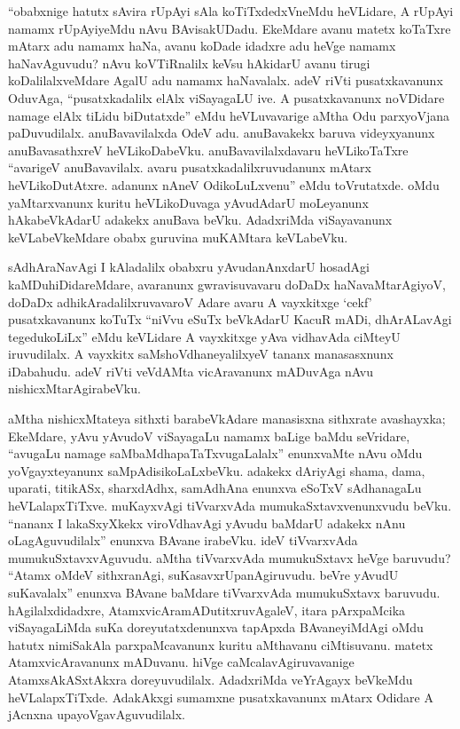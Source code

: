 ``obabxnige hatutx sAvira rUpAyi sAla koTiTxdedxVneMdu heVLidare, A rUpAyi namamx rUpAyiyeMdu nAvu BAvisakUDadu. EkeMdare avanu matetx koTaTxre mAtarx adu namamx haNa, avanu koDade idadxre adu heVge namamx haNavAguvudu? nAvu koVTiRnalilx keVsu hAkidarU avanu tirugi koDalilalxveMdare AgalU adu namamx haNavalalx. adeV riVti pusatxkavanunx OduvAga, ``pusatxkadalilx elAlx viSayagaLU ive. A pusatxkavanunx noVDidare namage elAlx tiLidu biDutatxde'' eMdu heVLuvavarige aMtha Odu parxyoVjana paDuvudilalx. anuBavavilalxda OdeV adu. anuBavakekx baruva videyxyanunx anuBavasathxreV heVLikoDabeVku. anuBavavilalxdavaru heVLikoTaTxre ``avarigeV anuBavavilalx. avaru pusatxkadalilxruvudanunx mAtarx heVLikoDutAtxre. adanunx nAneV OdikoLuLxvenu'' eMdu toVrutatxde. oMdu yaMtarxvanunx kuritu heVLikoDuvaga yAvudAdarU moLeyanunx hAkabeVkAdarU adakekx anuBava beVku. AdadxriMda viSayavanunx keVLabeVkeMdare obabx guruvina muKAMtara keVLabeVku.

sAdhAraNavAgi I kAladalilx obabxru yAvudanAnxdarU hosadAgi kaMDuhiDidareMdare, avaranunx gwravisuvavaru doDaDx haNavaMtarAgiyoV, doDaDx adhikAradalilxruvavaroV Adare avaru A vayxkitxge `cekf' pusatxkavanunx koTuTx ``niVvu eSuTx beVkAdarU KacuR mADi, dhArALavAgi tegedukoLiLx'' eMdu keVLidare A vayxkitxge yAva vidhavAda ciMteyU iruvudilalx. A vayxkitx saMshoVdhaneyalilxyeV tananx manasasxnunx iDabahudu. adeV riVti veVdAMta vicAravanunx mADuvAga nAvu nishicxMtarAgirabeVku.

aMtha nishicxMtateya sithxti barabeVkAdare manasisxna sithxrate avashayxka; EkeMdare, yAvu yAvudoV viSayagaLu namamx baLige baMdu seVridare, ``avugaLu namage saMbaMdhapaTaTxvugaLalalx'' enunxvaMte nAvu oMdu yoVgayxteyanunx saMpAdisikoLaLxbeVku. adakekx dAriyAgi shama, dama, uparati, titikASx, sharxdAdhx, samAdhAna enunxva eSoTxV sAdhanagaLu heVLalapxTiTxve. muKayxvAgi tiVvarxvAda mumukaSxtavxvenunxvudu beVku. ``nananx I lakaSxyXkekx viroVdhavAgi yAvudu baMdarU adakekx nAnu oLagAguvudilalx'' enunxva BAvane irabeVku. ideV tiVvarxvAda mumukuSxtavxvAguvudu. aMtha tiVvarxvAda mumukuSxtavx heVge baruvudu? ``Atamx oMdeV sithxranAgi, suKasavxrUpanAgiruvudu. beVre yAvudU suKavalalx'' enunxva BAvane baMdare tiVvarxvAda mumukuSxtavx baruvudu. hAgilalxdidadxre, AtamxvicAramADutitxruvAgaleV, itara pArxpaMcika viSayagaLiMda suKa doreyutatxdenunxva tapApxda BAvaneyiMdAgi oMdu hatutx nimiSakAla parxpaMcavanunx kuritu aMthavanu ciMtisuvanu. matetx AtamxvicAravanunx mADuvanu. hiVge caMcalavAgiruvavanige AtamxsAkASxtAkxra doreyuvudilalx. AdadxriMda veYrAgayx beVkeMdu heVLalapxTiTxde. AdakAkxgi sumamxne pusatxkavanunx mAtarx Odidare A jAcnxna upayoVgavAguvudilalx.

